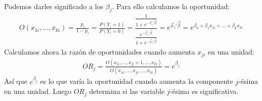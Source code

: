 \\
\newline
\noindent Podemos darles significado a los $\beta_j$. Para ello calculamos la oportunidad:
\begin{align*}
    O(x_{1i}, \dots, x_{ki}) = \frac{p_i}{1-p_i} = \frac{P(Y_i = 1)}{P(Y_i = 0)} = \dfrac{\frac{1}{1+e^{-\vec{x}_i'\vec{\beta}}}}{\frac{e^{-\vec{x}_i'\vec{\beta}}}{1+e^{-\vec{x}_i'\vec{\beta}}}} = e^{\vec{x}_i'\vec{\beta}} = e^{\beta_0 + \beta_1x_{1i} + \dots + \beta_kx_{ki}}
\end{align*}
Calculamos ahora la razón de oportunidades cuando aumenta $x_{ji}$ en una unidad:
\begin{align*}
    OR_j = \frac{O(x_{1i}, \dots, x_{ji}+1, \dots, x_{ki})}{O(x_{1i}, \dots, x_{ji}, \dots, x_{ki})} = e^{\beta_j}
\end{align*}
Así que $e^{\beta_j}$ es lo que varía la oportunidad cuando aumenta la componente $j$-ésima en una unidad. Luego $OR_j$ determina si las variable $j$-ésima es significativa.